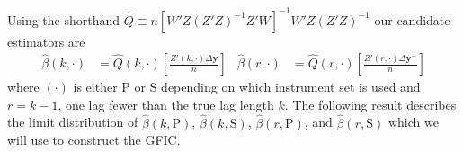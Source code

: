 Using the shorthand $\widehat{Q} \equiv n[W' Z(Z'Z)^{-1} Z'W]^{-1}W'Z(Z'Z)^{-1}$ our candidate estimators are
\begin{align}
  \widehat{\beta}(k,\cdot) &= \widehat{Q}(k,\cdot)\left[ \frac{Z'(k,\cdot)\Delta \mathbf{y}}{n} \right]& 
  \widehat{\beta}(r,\cdot) &= \widehat{Q}(r,\cdot)\left[ \frac{Z'(r,\cdot)\Delta \mathbf{y}^{+}}{n} \right]
  \label{eq:DpanelEstimators}
\end{align}
where $(\cdot)$ is either $\text{P}$ or $\text{S}$ depending on which instrument set is used and $r = k-1$, one lag fewer than the true lag length $k$.
The following result describes the limit distribution of $\widehat{\beta}(k,\text{P})$, $\widehat{\beta}(k,\text{S})$, $\widehat{\beta}(r,\text{P})$, and $\widehat{\beta}(r,\text{S})$ which we will use to construct the GFIC.

